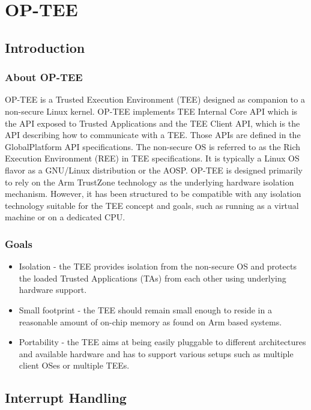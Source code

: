 \documentclass{article}
\begin{document}
\section{OP-TEE}

\subsection{Introduction}

\subsubsection{About OP-TEE}

OP-TEE is a Trusted Execution Environment (TEE) designed as companion to a non-secure Linux kernel. OP-TEE implements TEE Internal Core API which is the API exposed to Trusted Applications and the TEE Client API, which is the API describing how to communicate with a TEE. Those APIs are defined in the GlobalPlatform API specifications. The non-secure OS is referred to as the Rich Execution Environment (REE) in TEE specifications. It is typically a Linux OS flavor as a GNU/Linux distribution or the AOSP. OP-TEE is designed primarily to rely on the Arm TrustZone technology as the underlying hardware isolation mechanism. However, it has been structured to be compatible with any isolation technology suitable for the TEE concept and goals, such as running as a virtual machine or on a dedicated CPU.

\subsubsection{Goals}

\begin{itemize}
\item Isolation - the TEE provides isolation from the non-secure OS and protects the loaded Trusted Applications (TAs) from each other using underlying hardware support.
\item Small footprint - the TEE should remain small enough to reside in a reasonable amount of on-chip memory as found on Arm based systems.
\item Portability - the TEE aims at being easily pluggable to different architectures and available hardware and has to support various setups such as multiple client OSes or multiple TEEs.
\end{itemize}

\subsection{Interrupt Handling}
\end{document}
